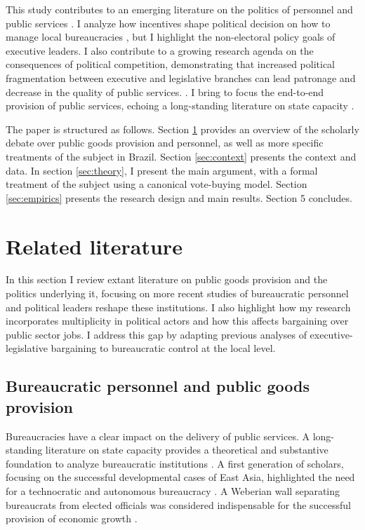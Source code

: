 \documentclass[12pt,a4paper]{article}
\begin{document}
This study contributes to an emerging literature on the politics of personnel and public services \citep{pepinsky_bureaucracy_2017, finan_personnel_2015}. I analyze how incentives shape political decision on how to manage local bureaucracies \citep{duflo_incentives_2012, gulzar_politicians_2017}, but I highlight the non-electoral policy goals of executive leaders. I also contribute to a growing research agenda on the consequences of political competition, demonstrating that increased political fragmentation between executive and legislative branches can lead patronage and decrease in the quality of public services. \citep{gottlieb_countervailing_2019, ferraz_corrupting_2012}. I bring to focus the end-to-end provision of public services, echoing a long-standing literature on state capacity \citep{kohli_state-directed_2004, evans_embedded_1995}.

The paper is structured as follows. Section \ref{sec:literature} provides an overview of the scholarly debate over public goods provision and personnel, as well as more specific treatments of the subject in Brazil. Section \ref{sec:context} presents the context and data. In section \ref{sec:theory}, I present the main argument, with a formal treatment of the subject using a canonical vote-buying model. Section \ref{sec:empirics} presents the research design and main results. Section 5 concludes.

\section{Related literature}
\label{sec:literature}

In this section I review extant literature on public goods provision and the politics underlying it, focusing on more recent studies of bureaucratic personnel and political leaders reshape these institutions. I also highlight how my research incorporates multiplicity in political actors and how this affects bargaining over public sector jobs. I address this gap by adapting previous analyses of executive-legislative bargaining to bureaucratic control at the local level.

\subsection*{Bureaucratic personnel and public goods provision}

Bureaucracies have a clear impact on the delivery of public services. A long-standing literature on state capacity provides a theoretical and substantive foundation to analyze bureaucratic institutions \citep{centeno_unpacking_2017, kohli_state-directed_2004}. A first generation of scholars, focusing on the successful developmental cases of East Asia, highlighted the need for a technocratic and autonomous bureaucracy \citep{johnson_miti_1982, kohli_state-directed_2004}. A Weberian wall separating bureaucrats from elected officials was considered indispensable for the successful provision of economic growth \citep{evans_bureaucracy_1999}.
\end{document}
